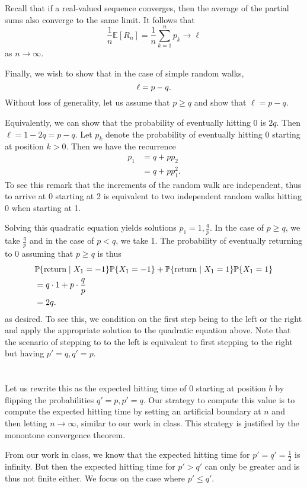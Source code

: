\documentclass[10pt]{article}
\DeclarePairedDelimiter{\set}{\lbrace}{\rbrace}
\let\abs\relax
\DeclarePairedDelimiter{\abs}{\lvert}{\rvert}
\newcommand{\E}{\mathbb{E}}
\renewcommand{\P}{\mathbb{P}}
\begin{document}
Recall that if a real-valued sequence converges,
then the average of the partial sums also converge to the same limit.
It follows that
\[
  \frac1n \E[R_n]
  = \frac1n \sum_{k=1}^n p_k
  \to \ell
\]
as $n\to \infty$.

Finally,
we wish to show that in the case of simple random walks,
\[
  \ell = \abs{p-q}.
\]
Without loss of generality,
let us assume that $p\geq q$
and show that $\ell = p-q$.

Equivalently,
we can show that the probability of eventually hitting 0 is $2q$.
Then $\ell = 1-2q = p-q$.
Let $p_k$ denote the probability of eventually hitting 0
starting at position $k > 0$.
Then we have the recurrence
\begin{align*}
  p_1
  &= q + p p_2 \\
  &= q + p p_1^2.
\end{align*}
To see this remark that the increments of the random walk are independent,
thus to arrive at 0 starting at 2
is equivalent to two independent random walks hitting 0 when starting at 1.

Solving this quadratic equation yields solutions $p_1 = 1, \frac qp$.
In the case of $p\geq q$,
we take $\frac qp$
and in the case of $p < q$,
we take 1.
The probability of eventually returning to 0
assuming that $p\geq q$ is thus
\begin{align*}
  &\P\set{\text{return}\mid X_1=-1}\P\set{X_1=-1}
  + \P\set{\text{return}\mid X_1=1}\P\set{X_1=1} \\
  &= q\cdot 1 + p\cdot \frac qp \\
  &= 2q.
\end{align*}
as desired.
To see this,
we condition on the first step being to the left or the right
and apply the appropriate solution to the quadratic equation above.
Note that the scenario of stepping to to the left is equivalent to first stepping to the right
but having $p'=q, q'=p$.

\clearpage
\section{}
Let us rewrite this as the expected hitting time of 0 starting at position $b$
by flipping the probabilities $q'=p, p'=q$.
Our strategy to compute this value is to compute the expected hitting time by setting an artificial boundary at $n$
and then letting $n\to \infty$,
similar to our work in class.
This strategy is justified by the monontone convergence theorem.

From our work in class,
we know that the expected hitting time for $p'=q'=\frac12$ is infinity.
But then the expected hitting time for $p'>q'$ can only be greater
and is thus not finite either.
We focus on the case where $p'\leq q'$.
\end{document}
